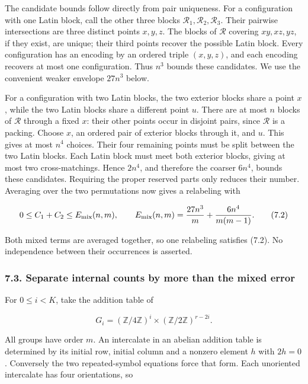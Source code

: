 \documentclass[english,11pt,a4paper]{article}
\begin{document}
The candidate bounds follow directly from pair uniqueness. For a configuration with one Latin block, call the other three blocks \(\mathcal R_1,\mathcal R_2,\mathcal R_3\). Their pairwise intersections are three distinct points \(x,y,z\). The blocks of \(\mathcal R\) covering \(xy,xz,yz\), if they exist, are unique; their third points recover the possible Latin block. Every configuration has an encoding by an ordered triple \((x,y,z)\), and each encoding recovers at most one configuration. Thus \(n^3\) bounds these candidates. We use the convenient weaker envelope \(27n^3\) below.

For a configuration with two Latin blocks, the two exterior blocks share a point \(x\), while the two Latin blocks share a different point \(u\). There are at most \(n\) blocks of \(\mathcal R\) through a fixed \(x\): their other points occur in disjoint pairs, since \(\mathcal R\) is a packing. Choose \(x\), an ordered pair of exterior blocks through it, and \(u\). This gives at most \(n^4\) choices. Their four remaining points must be split between the two Latin blocks. Each Latin block must meet both exterior blocks, giving at most two cross-matchings. Hence \(2n^4\), and therefore the coarser \(6n^4\), bounds these candidates. Requiring the proper reserved parts only reduces their number. Averaging over the two permutations now gives a relabeling with

\[0\le C_1+C_2\le E_{\rm mix}(n,m),\qquad
E_{\rm mix}(n,m)=\frac{27n^3}{m}+\frac{6n^4}{m(m-1)}.\tag{7.2}\]

Both mixed terms are averaged together, so one relabeling satisfies (7.2). No independence between their occurrences is asserted.

\subsubsection{7.3. Separate internal counts by more than the mixed error}\label{separate-internal-counts-by-more-than-the-mixed-error}

For \(0\le i<K\), take the addition table of

\[G_i=(\mathbb Z/4\mathbb Z)^i\times(\mathbb Z/2\mathbb Z)^{r-2i}.\]

All groups have order \(m\). An intercalate in an abelian addition table is determined by its initial row, initial column and a nonzero element \(h\) with \(2h=0\). Conversely the two repeated-symbol equations force that form. Each unoriented intercalate has four orientations, so
\end{document}
